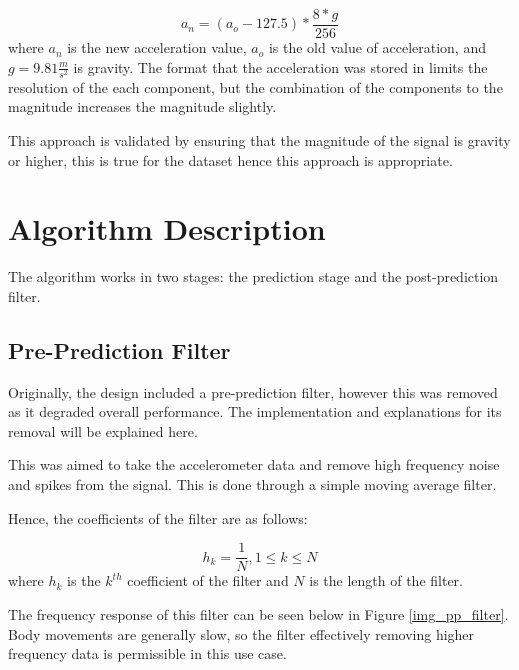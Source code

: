             \begin{equation}
                a_n = (a_o - 127.5)*\frac{8*g}{256}
            \end{equation}
            where $a_n$ is the new acceleration value, $a_o$ is the old value of acceleration, and $g=9.81\frac{m}{s^2}$ is gravity. The format that the acceleration was stored in limits the resolution of the each component, but the combination of the components to the magnitude increases the magnitude slightly.

            This approach is validated by ensuring that the magnitude of the signal is gravity or higher, this is true for the dataset hence this approach is appropriate.



    \chapter{Algorithm Description}

        The algorithm works in two stages: the prediction stage and the post-prediction filter.

        \section{Pre-Prediction Filter}

            Originally, the design included a pre-prediction filter, however this was removed as it degraded overall performance. The implementation and explanations for its removal will be explained here.

            This was aimed to take the accelerometer data and remove high frequency noise and spikes from the signal. This is done through a simple moving average filter.

            Hence, the coefficients of the filter are as follows:

            \begin{equation}
                h_k = \frac{1}{N}, 1\leq k\leq N
            \end{equation}
            where $h_k$ is the $k^{th}$ coefficient of the filter and $N$ is the length of the filter.

            The frequency response of this filter can be seen below in Figure \ref{img_pp_filter}. Body movements are generally slow, so the filter effectively removing higher frequency data is permissible in this use case.

